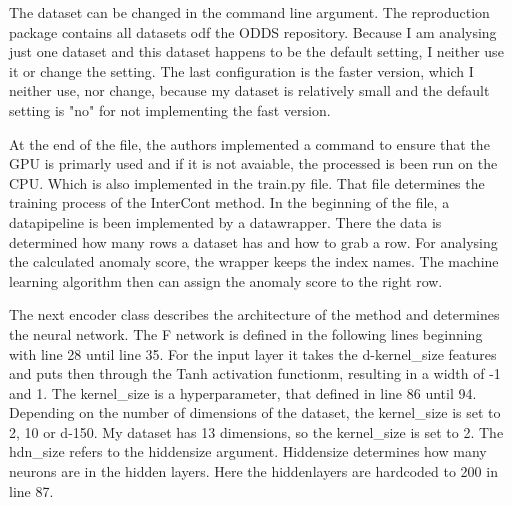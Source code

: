 The dataset can be changed in the command line argument.
The reproduction package contains all datasets odf the ODDS repository. 
Because I am analysing just one dataset and this dataset happens to be the default setting, I neither use it or change the setting.
The last configuration is the faster version, which I neither use, nor change, because my dataset is relatively small and the default setting is "no" for not implementing the fast version.
 

At the end of the file, the authors implemented a command to ensure that the GPU is primarly used and if it is not avaiable, the processed is been run on the CPU.
Which is also implemented in the train.py file. 
That file determines the training process of the InterCont method.
In the beginning of the file, a datapipeline is been implemented by a datawrapper. 
There the data is determined how many rows a dataset has and how to grab a row. 
For analysing the calculated anomaly score, the wrapper keeps the index names.
The machine learning algorithm then can assign the anomaly score to the right row.


The next encoder class describes the architecture of the method and determines the neural network.
The F network is defined in the following lines beginning with line 28 until line 35.
For the input layer it takes the d-kernel\_size features and puts then through the Tanh activation functionm, resulting in a width of -1 and 1.
The kernel\_size is a hyperparameter, that defined in line 86 until 94. 
Depending on the number of dimensions of the dataset, the kernel\_size is set to 2, 10 or d-150. 
My dataset has 13 dimensions, so the kernel\_size is set to 2.
The hdn\_size refers to the hiddensize argument.
Hiddensize determines how many neurons are in the hidden layers.
Here the hiddenlayers are hardcoded to 200 in line 87. 






